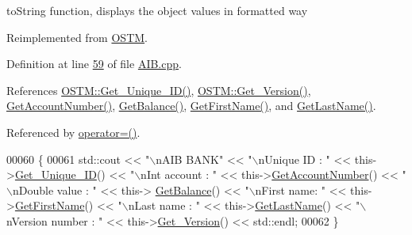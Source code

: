 to\+String function, displays the object values in formatted way 



Reimplemented from \hyperlink{class_o_s_t_m_a513396a115f2987fd07c203309ae8a59_a513396a115f2987fd07c203309ae8a59}{O\+S\+TM}.



Definition at line \hyperlink{_a_i_b_8cpp_source_l00059}{59} of file \hyperlink{_a_i_b_8cpp_source}{A\+I\+B.\+cpp}.



References \hyperlink{_o_s_t_m_8cpp_source_l00082}{O\+S\+T\+M\+::\+Get\+\_\+\+Unique\+\_\+\+I\+D()}, \hyperlink{_o_s_t_m_8cpp_source_l00100}{O\+S\+T\+M\+::\+Get\+\_\+\+Version()}, \hyperlink{_a_i_b_8cpp_source_l00096}{Get\+Account\+Number()}, \hyperlink{_a_i_b_8cpp_source_l00084}{Get\+Balance()}, \hyperlink{_a_i_b_8cpp_source_l00120}{Get\+First\+Name()}, and \hyperlink{_a_i_b_8cpp_source_l00108}{Get\+Last\+Name()}.



Referenced by \hyperlink{_a_i_b_8h_source_l00078}{operator=()}.


\begin{DoxyCode}
00060 \{
00061     std::cout << \textcolor{stringliteral}{"\(\backslash\)nAIB BANK"} << \textcolor{stringliteral}{"\(\backslash\)nUnique ID : "} << this->\hyperlink{class_o_s_t_m_a5a01a8b98d16b1d1904ecf9356e7b71d_a5a01a8b98d16b1d1904ecf9356e7b71d}{Get\_Unique\_ID}() << \textcolor{stringliteral}{"\(\backslash\)nInt account :
       "} << this->\hyperlink{class_a_i_b_aef34bfbf20d767114e05b8b532cab777_aef34bfbf20d767114e05b8b532cab777}{GetAccountNumber}() << \textcolor{stringliteral}{"\(\backslash\)nDouble value : "} << this->
      \hyperlink{class_a_i_b_ac75087ae73c308bd946e47a71dc85b86_ac75087ae73c308bd946e47a71dc85b86}{GetBalance}() << \textcolor{stringliteral}{"\(\backslash\)nFirst name: "} << this->\hyperlink{class_a_i_b_aa0833919c1c211481560cd88cb5b381b_aa0833919c1c211481560cd88cb5b381b}{GetFirstName}() << \textcolor{stringliteral}{"\(\backslash\)nLast name : "} << 
      this->\hyperlink{class_a_i_b_a1b09db7268734beeaf6a9e7e9d8feb02_a1b09db7268734beeaf6a9e7e9d8feb02}{GetLastName}()  << \textcolor{stringliteral}{"\(\backslash\)nVersion number : "} << this->\hyperlink{class_o_s_t_m_a1f1db9d482f22c8e7caa17dfb340626b_a1f1db9d482f22c8e7caa17dfb340626b}{Get\_Version}() << std::endl;
00062 \}
\end{DoxyCode}


